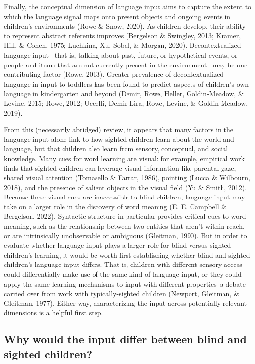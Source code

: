 \documentclass[
  man]{apa6}
\begin{document}
Finally, the conceptual dimension of language input aims to capture the extent to which the language signal maps onto present objects and ongoing events in children's environments (Rowe \& Snow, 2020). As children develop, their ability to represent abstract referents improves (Bergelson \& Swingley, 2013; Kramer, Hill, \& Cohen, 1975; Luchkina, Xu, Sobel, \& Morgan, 2020). Decontextualized language input-- that is, talking about past, future, or hypothetical events, or people and items that are not currently present in the environment-- may be one contributing factor (Rowe, 2013). Greater prevalence of decontextualized language in input to toddlers has been found to predict aspects of children's own language in kindergarten and beyond (Demir, Rowe, Heller, Goldin-Meadow, \& Levine, 2015; Rowe, 2012; Uccelli, Demir-Lira, Rowe, Levine, \& Goldin-Meadow, 2019).

From this (necessarily abridged) review, it appears that many factors in the language input alone link to how sighted children learn about the world and language, but that children also learn from sensory, conceptual, and social knowledge. Many cues for word learning are visual: for example, empirical work finds that sighted children can leverage visual information like parental gaze, shared visual attention (Tomasello \& Farrar, 1986), pointing (Lucca \& Wilbourn, 2018), and the presence of salient objects in the visual field (Yu \& Smith, 2012). Because these visual cues are inaccessible to blind children, language input may take on a larger role in the discovery of word meaning (E. E. Campbell \& Bergelson, 2022). Syntactic structure in particular provides critical cues to word meaning, such as the relationship between two entities that aren't within reach, or are intrinsically unobservable or ambiguous (Gleitman, 1990). But in order to evaluate whether language input plays a larger role for blind versus sighted children's learning, it would be worth first establishing whether blind and sighted children's language input differs. That is, children with different sensory access could differentially make use of the same kind of language input, or they could apply the same learning mechanisms to input with different properties--a debate carried over from work with typically-sighted children (Newport, Gleitman, \& Gleitman, 1977). Either way, characterizing the input across potentially relevant dimensions is a helpful first step.

\hypertarget{why-would-the-input-differ-between-blind-and-sighted-children}{%
\subsection{Why would the input differ between blind and sighted children?}\label{why-would-the-input-differ-between-blind-and-sighted-children}}
\end{document}
